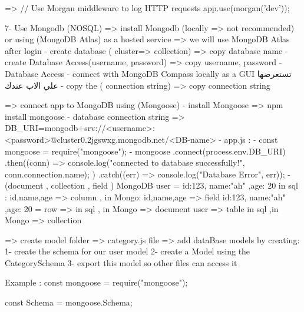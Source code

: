     => // Use Morgan middleware to log HTTP requests
        app.use(morgan('dev'));

 

7- Use Mongodb (NOSQL)
    => install Mongodb (locally => not recommended)   or using (MongoDB Atlas) as a hosted service
    => we will use MongoDB Atlas after login
            - create database ( cluster=> collection) => copy database name
            - create Database Access(username, password) => copy username, password
            - Database Access
            - connect with MongoDB Compass locally as a GUI تستعرضها علي الاب عندك
            - copy the ( connection string) => copy connection string
    
    => connect app to MongoDB using (Mongoose)
        - install Mongoose => npm install mongoose
        - database connection string => DB_URI=mongodb+srv://<username>:<password>@cluster0.2jgswxg.mongodb.net/<DB-name>
        - app.js : 
                - const mongoose = require("mongoose");
                - mongoose
                        .connect(process.env.DB_URI)
                        .then((conn) => {
                            console.log("connected to database successfully!", conn.connection.name);
                        })
                        .catch((err) => console.log("Database Error", err));
                - (document , collection , field ) MongoDB
                        user = {id:123, name:"ah" ,age: 20}  in sql : id,name,age => column ,  in Mongo: id,name,age => field
                            {id:123, name:"ah" ,age: 20}  = row => in sql , in Mongo => document
                            user => table in sql ,in Mongo => collection

    => create model folder => category.js file 
    => add dataBase models by creating:  1- create the schema for our user model
                                         2- create a Model using the CategorySchema 
                                         3- export this model so other files can access it

                                    Example :
                                                const mongoose = require("mongoose");

                                                const Schema = mongoose.Schema;
                                                

